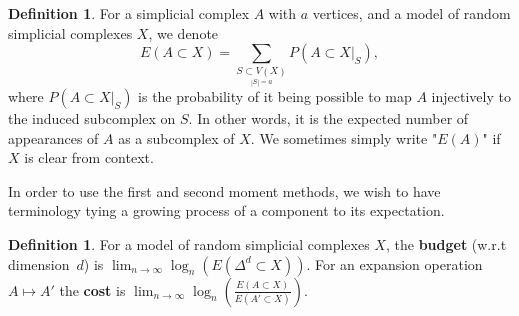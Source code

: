 \documentclass{article}
\newcommand{\prs}[1]{\left( #1 \right)}
\theoremstyle{plain}
\theoremstyle{definition}
\newtheorem{definition}[theorem]{Definition}
\theoremstyle{remark}
\newcommand{\di}{dimension}
\begin{document}
\begin{definition}\label{defPartial}
    For a simplicial complex $A$ with $a$ vertices, and a model of random simplicial complexes $X$, we denote 
    $$E(A\subset X)=\sum_{\underset{|S|=a}{S\subset V(X)}}P(A\subset X|_S),$$
    where $P(A\subset X|_S)$ is the probability of it being possible to map $A$ injectively to the induced subcomplex on $S$.
    In other words, it is the expected number of appearances of $A$ as a subcomplex of $X$. We sometimes simply write "$E(A)$" if $X$ is clear from context.
\end{definition}
In order to use the first and second moment methods, we wish to have terminology tying a growing process of a component to its expectation.
\begin{definition}\label{defBudgetCost}
    For a model of random simplicial complexes $X$, the \textbf{budget} (w.r.t \di\ $d$) is $\lim_{n\to \infty}\log_n(E(\Delta^d\subset X))$.
    For an expansion operation $A\mapsto A'$ the \textbf{cost} is $\lim_{n\to \infty}\log_n\prs{\frac{E(A\subset X)}{E(A'\subset X)}}$. 
    
\end{definition}
\end{document}
